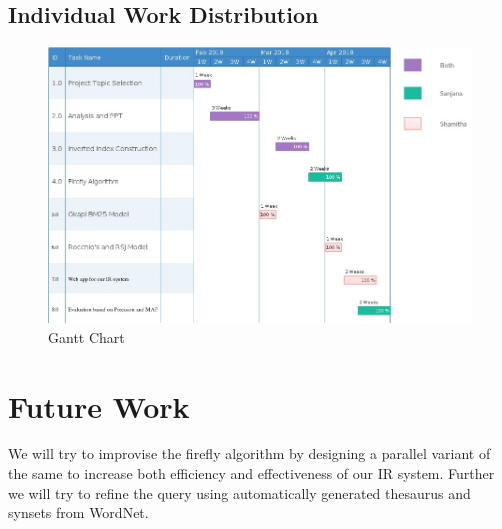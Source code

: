 \documentclass{nitk}
\begin{document}
 \subsection{Individual Work Distribution}
 \begin{figure}[!htb]
\centering
 \includegraphics[scale=0.5]{IR_Gantt_Chart_}
 \caption{Gantt Chart}
 \label{fig:GC}
 \end{figure}
 \section{Future Work}
 We will try to improvise the firefly algorithm by designing a parallel variant of the same to increase both efficiency and effectiveness of our IR system. Further we will try to refine the query using automatically generated thesaurus and synsets from WordNet.
\newpage


\end{document}
